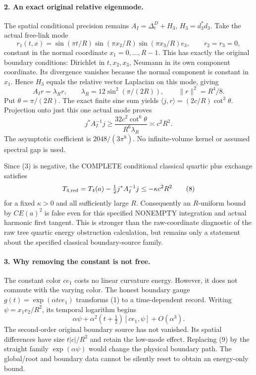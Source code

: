 \documentclass[11pt]{article}
\begin{document}
\paragraph{2. An exact original relative eigenmode.}
The spatial conditional precision remains
$A_I=\Delta_t^D+H_3$, $H_3=d_3^*d_3$.
Take the actual free-link mode
\[
 r_1(t,x)=\sin(\pi t/R)\sin(\pi x_2/R)\sin(\pi x_3/R)e_3,
 \qquad r_2=r_3=0,                                         \tag{5}
\]
constant in the normal coordinate $x_1=0,\ldots,R-1$.
This has exactly the original boundary conditions: Dirichlet in
$t,x_2,x_3$, Neumann in its own component coordinate. Its divergence
vanishes because the normal component is constant in $x_1$.
Hence $H_3$ equals the relative vector Laplacian on this mode, giving
\[
 A_Ir=\lambda_Rr,\qquad
 \lambda_R=12\sin^2(\pi/(2R)),\qquad \|r\|^2=R^4/8.         \tag{6}
\]
Put $\theta=\pi/(2R)$. The exact finite sine sum yields
$\langle j,r\rangle=(2c/R)\cot^3\theta$.
Projection onto just this one actual mode proves
\[
 \boxed{j^*A_I^{-1}j\ge
       \frac{32c^2\cot^6\theta}{R^6\lambda_R}
       \asymp c^2R^2.}                                     \tag{7}
\]
The asymptotic coefficient is $2048/(3\pi^8)$.
No infinite-volume kernel or assumed spectral gap is used.

Since (3) is negative, the COMPLETE conditional classical quartic
plus exchange satisfies
\[
 T_{4,\rm red}=T_4(a)-\tfrac12j^*A_I^{-1}j
                        \le-\kappa c^2R^2                 \tag{8}
\]
for a fixed $\kappa>0$ and all sufficiently large $R$.
Consequently an $R$-uniform bound by $CE(a)^2$ is false even for
this specified NONEMPTY integration and actual harmonic first tangent.
This is stronger than the raw-coordinate diagnostic of the raw tree quartic energy obstruction calculation, but remains
only a statement about the specified classical boundary-source family.

\paragraph{3. Why removing the constant is not free.}
The constant color $c e_1$ costs no linear curvature energy. However,
it does not commute with the varying color. The honest boundary gauge
$g(t)=\exp(\alpha t c e_1)$ transforms (1) to a time-dependent record.
Writing $\psi=x_1 e_2/R^2$, its temporal logarithm begins
\[
 \alpha\psi+\alpha^2(t+\tfrac12)[c e_1,\psi]+O(\alpha^3).
                                                               \tag{9}
\]
The second-order original boundary source has not vanished. Its
spatial differences have size $t|c|/R^2$ and retain the low-mode
effect. Replacing (9) by the straight family $\exp(\alpha\psi)$
would change the physical boundary path. The global/root and boundary
data cannot be silently reset to obtain an energy-only bound.
\end{document}
